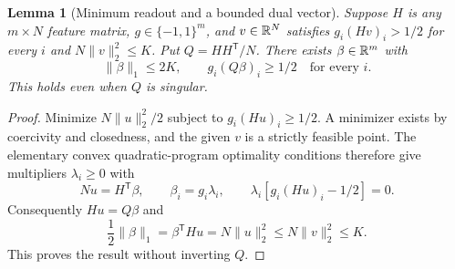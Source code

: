 \documentclass[11pt]{article}
\newtheorem{lemma}[theorem]{Lemma}\newtheorem{corollary}[theorem]{Corollary}
\theoremstyle{remark}\newtheorem{remark}[theorem]{Remark}
\begin{document}
\begin{lemma}[Minimum readout and a bounded dual vector]
\label{lem:readout-dual}
Suppose $H$ is any $m\times N$ feature matrix, $g\in\{-1,1\}^m$, and
$v\in\mathbb R^N$ satisfies $g_i(Hv)_i>1/2$ for every $i$ and
$N\|v\|_2^2\leq K$. Put $Q=HH^{\mathsf T}/N$.
There exists $\beta\in\mathbb R^m$ with
\[
 \|\beta\|_1\leq2K,
 \qquad g_i(Q\beta)_i\geq1/2\quad\text{for every }i.
\]
This holds even when $Q$ is singular.
\end{lemma}
\begin{proof}
Minimize $N\|u\|_2^2/2$ subject to $g_i(Hu)_i\geq1/2$.
A minimizer exists by coercivity and closedness, and the given $v$ is a
strictly feasible point. The elementary convex quadratic-program
optimality conditions therefore give multipliers $\lambda_i\geq0$ with
\[
 Nu=H^{\mathsf T}\beta,
 \qquad\beta_i=g_i\lambda_i,
 \qquad\lambda_i[g_i(Hu)_i-1/2]=0.
\]
Consequently $Hu=Q\beta$ and
\[
 \frac12\|\beta\|_1
 =\beta^{\mathsf T}Hu
 =N\|u\|_2^2\leq N\|v\|_2^2\leq K.
\]
This proves the result without inverting $Q$.
\end{proof}
\end{document}
